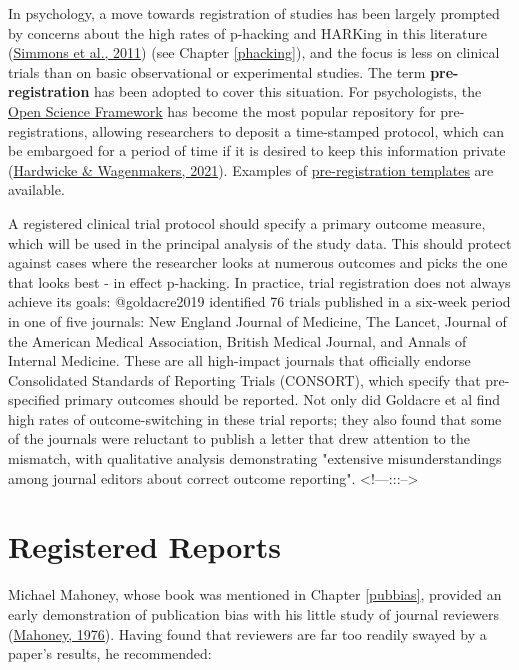 \documentclass{krantz}
\begin{document}
In psychology, a move towards registration of studies has been largely prompted by concerns about the high rates of p-hacking and HARKing in this literature (\protect\hyperlink{ref-simmons2011}{Simmons et al., 2011}) (see Chapter \ref{phacking}), and the focus is less on clinical trials than on basic observational or experimental studies. The term \textbf{pre-registration} has been adopted to cover this situation. For psychologists, the \href{https://osf.io}{Open Science Framework} has become the most popular repository for pre-registrations, allowing researchers to deposit a time-stamped protocol, which can be embargoed for a period of time if it is desired to keep this information private (\protect\hyperlink{ref-hardwicke2021}{Hardwicke \& Wagenmakers, 2021}). Examples of \href{https://cos.io/rr/}{pre-registration templates} are available.

\begin{tcolorbox}[colback=Black!5!lightgray,colframe=black!75!black,coltitle=white,title=Does trial registration prevent outcome-switching?]\label{box:switch}
A registered clinical trial protocol should specify a primary outcome measure, which will be used in the principal analysis of the study data. This should protect against cases where the researcher looks at numerous outcomes and picks the one that looks best - in effect p-hacking. In practice, trial registration does not always achieve its goals: @goldacre2019 identified 76 trials published in a six-week period in one of five journals: New England Journal of Medicine, The Lancet, Journal of the American Medical Association, British Medical Journal, and Annals of Internal Medicine. These are all high-impact journals that officially endorse Consolidated Standards of Reporting Trials (CONSORT), which specify that pre-specified primary outcomes should be reported. Not only did Goldacre et al find high rates of outcome-switching in these trial reports; they also found that some of the journals were reluctant to publish a letter that drew attention to the mismatch, with qualitative analysis demonstrating "extensive misunderstandings among journal editors about correct outcome reporting".
<!---:::-->
\end{tcolorbox}

\hypertarget{registered-reports}{%
\section{Registered Reports}\label{registered-reports}}

Michael Mahoney, whose book was mentioned in Chapter \ref{pubbias}, provided an early demonstration of publication bias with his little study of journal reviewers (\protect\hyperlink{ref-mahoney1976}{Mahoney, 1976}). Having found that reviewers are far too readily swayed by a paper's results, he recommended:
\end{document}
